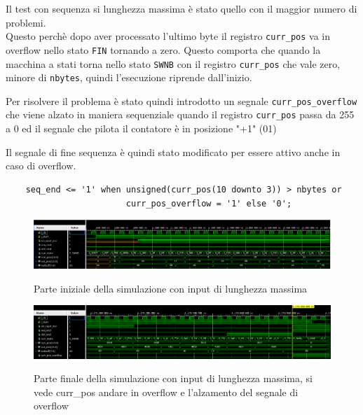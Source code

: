 \documentclass[12pt, a4paper]{article}
\begin{document}
Il test con sequenza si lunghezza massima è stato quello con il maggior numero di problemi. \\
Questo perchè dopo aver processato l'ultimo byte il registro \texttt{curr\_pos} va in overflow
nello stato \texttt{FIN} tornando a zero.
\noindent Questo comporta che quando la macchina a stati torna nello stato \texttt{SWNB} con il registro \texttt{curr\_pos} 
che vale zero, minore di \texttt{nbytes}, quindi l'esecuzione riprende dall'inizio.

\noindent Per risolvere il problema è stato quindi introdotto un segnale \texttt{curr\_pos\_overflow} che viene alzato in maniera sequenziale
quando il registro \texttt{curr\_pos} passa da 255 a 0 ed il segnale che pilota il contatore è in posizione "+1" (01)

\noindent Il segnale di fine sequenza è quindi stato modificato per essere attivo anche in caso di
overflow.

\begin{verbatim}
    seq_end <= '1' when unsigned(curr_pos(10 downto 3)) > nbytes or 
                        curr_pos_overflow = '1' else '0';
\end{verbatim}

\begin{figure}[h!]
    \centering
    \includegraphics[scale=0.3]{sim_maxlen_init.png}
    \label{img:sim_max_init}
    \caption{Parte iniziale della simulazione con input di lunghezza massima}
\end{figure}

\begin{figure}[h!]
    \centering
    \includegraphics[scale=0.3]{sim_maxlen_end.png}
    \label{img:sim_max_end}
    \caption{Parte finale della simulazione con input di lunghezza massima, si vede curr\_pos andare in overflow e l'alzamento del segnale di overflow}
\end{figure}


\pagebreak
\end{document}
